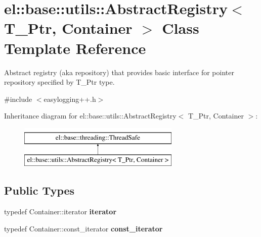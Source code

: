 \hypertarget{classel_1_1base_1_1utils_1_1AbstractRegistry}{\section{el\-:\-:base\-:\-:utils\-:\-:Abstract\-Registry$<$ T\-\_\-\-Ptr, Container $>$ Class Template Reference}
\label{classel_1_1base_1_1utils_1_1AbstractRegistry}
}


Abstract registry (aka repository) that provides basic interface for pointer repository specified by T\-\_\-\-Ptr type.  




{\ttfamily \#include $<$easylogging++.\-h$>$}

Inheritance diagram for el\-:\-:base\-:\-:utils\-:\-:Abstract\-Registry$<$ T\-\_\-\-Ptr, Container $>$\-:\begin{figure}[H]
\begin{center}
\leavevmode
\includegraphics[height=2.000000cm]{classel_1_1base_1_1utils_1_1AbstractRegistry}
\end{center}
\end{figure}
\subsection*{Public Types}
\begin{DoxyCompactItemize}
\item 
\hypertarget{classel_1_1base_1_1utils_1_1AbstractRegistry_a58d0536c748633afd3f7c237b63a9a7c}{typedef Container\-::iterator {\bfseries iterator}}\label{classel_1_1base_1_1utils_1_1AbstractRegistry_a58d0536c748633afd3f7c237b63a9a7c}

\item 
\hypertarget{classel_1_1base_1_1utils_1_1AbstractRegistry_a3bbf19b112c067cb1a02a82b003cc7e2}{typedef Container\-::const\-\_\-iterator {\bfseries const\-\_\-iterator}}\label{classel_1_1base_1_1utils_1_1AbstractRegistry_a3bbf19b112c067cb1a02a82b003cc7e2}

\end{DoxyCompactItemize}
